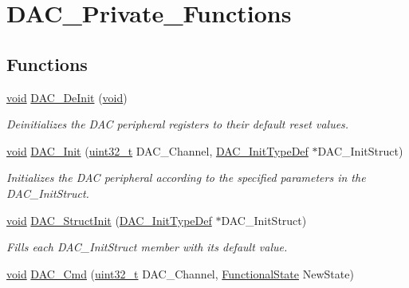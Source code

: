 \hypertarget{group___d_a_c___private___functions}{}\section{D\+A\+C\+\_\+\+Private\+\_\+\+Functions}
\label{group___d_a_c___private___functions}
\subsection*{Functions}
\begin{DoxyCompactItemize}
\item 
\hyperlink{usb__devapi_8h_afabf60e7f57651d6d595a02c75f07cd0}{void} \hyperlink{group___d_a_c___private___functions_ga1fae225204e1e049d6795319e99ba8bc}{D\+A\+C\+\_\+\+De\+Init} (\hyperlink{usb__devapi_8h_afabf60e7f57651d6d595a02c75f07cd0}{void})
\begin{DoxyCompactList}\small\item\em Deinitializes the D\+AC peripheral registers to their default reset values. \end{DoxyCompactList}\item 
\hyperlink{usb__devapi_8h_afabf60e7f57651d6d595a02c75f07cd0}{void} \hyperlink{group___d_a_c___private___functions_ga7c59850468ed4bf0659663fe495441da}{D\+A\+C\+\_\+\+Init} (\hyperlink{_p_e___types_8h_a33594304e786b158f3fb30289278f5af}{uint32\+\_\+t} D\+A\+C\+\_\+\+Channel, \hyperlink{struct_d_a_c___init_type_def}{D\+A\+C\+\_\+\+Init\+Type\+Def} $\ast$D\+A\+C\+\_\+\+Init\+Struct)
\begin{DoxyCompactList}\small\item\em Initializes the D\+AC peripheral according to the specified parameters in the D\+A\+C\+\_\+\+Init\+Struct. \end{DoxyCompactList}\item 
\hyperlink{usb__devapi_8h_afabf60e7f57651d6d595a02c75f07cd0}{void} \hyperlink{group___d_a_c___private___functions_gadfc270974d54cb5fa5f92556015c4046}{D\+A\+C\+\_\+\+Struct\+Init} (\hyperlink{struct_d_a_c___init_type_def}{D\+A\+C\+\_\+\+Init\+Type\+Def} $\ast$D\+A\+C\+\_\+\+Init\+Struct)
\begin{DoxyCompactList}\small\item\em Fills each D\+A\+C\+\_\+\+Init\+Struct member with its default value. \end{DoxyCompactList}\item 
\hyperlink{usb__devapi_8h_afabf60e7f57651d6d595a02c75f07cd0}{void} \hyperlink{group___d_a_c___private___functions_ga323e61530d7fa9396c3bce9edb61f733}{D\+A\+C\+\_\+\+Cmd} (\hyperlink{_p_e___types_8h_a33594304e786b158f3fb30289278f5af}{uint32\+\_\+t} D\+A\+C\+\_\+\+Channel, \hyperlink{agilefox_2library_2inc_2stm32f10x__type_8h_ac9a7e9a35d2513ec15c3b537aaa4fba1}{Functional\+State} New\+State)

\end{DoxyCompactItemize}
